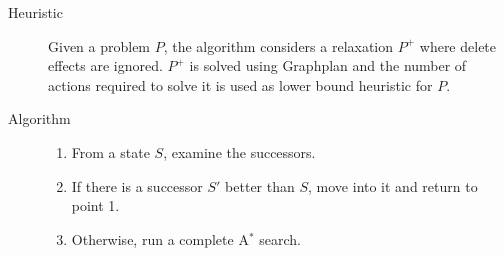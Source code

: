 \begin{description}
    \item[Heuristic]
        Given a problem $P$, the algorithm considers a relaxation $P^+$ 
        where delete effects are ignored.
        $P^+$ is solved using Graphplan and the number of actions required to solve it is used as lower bound heuristic for $P$.

    \item[Algorithm] \phantom{}
        \begin{enumerate}
            \item From a state $S$, examine the successors.
            \item If there is a successor $S'$ better than $S$, move into it and return to point 1.
            \item Otherwise, run a complete A$^*$ search.
        \end{enumerate}
\end{description}